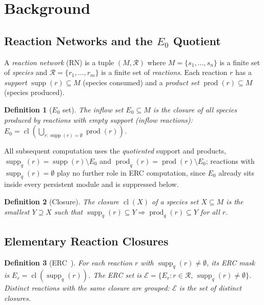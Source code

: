 \documentclass[11pt]{article}
\theoremstyle{plain}
\newtheorem{definition}{Definition}
\theoremstyle{remark}
\newcommand{\supp}{\operatorname{supp}}
\newcommand{\prods}{\operatorname{prod}}
\newcommand{\cl}{\operatorname{cl}}
\newcommand{\E}{\mathcal{E}}
\newcommand{\R}{\mathcal{R}}
\newcommand{\M}{M}
\begin{document}
\section{Background}\label{sec:background}

\subsection{Reaction Networks and the $E_0$ Quotient}

A \emph{reaction network} (RN) is a tuple $(\M, \R)$ where
$\M = \{s_1,\ldots,s_n\}$ is a finite set of \emph{species} and
$\R = \{r_1,\ldots,r_m\}$ is a finite set of \emph{reactions}.
Each reaction $r$ has a \emph{support} $\supp(r) \subseteq \M$
(species consumed) and a \emph{product set} $\prods(r) \subseteq \M$
(species produced).

\begin{definition}[$E_0$ set]
The \emph{inflow set} $E_0 \subseteq \M$ is the closure of all species
produced by reactions with empty support (\emph{inflow reactions}):
$E_0 = \cl(\bigcup_{r:\supp(r)=\emptyset}\prods(r))$.
\end{definition}

All subsequent computation uses the \emph{quotiented} support and
products, $\supp_q(r) = \supp(r) \setminus E_0$ and
$\prods_q(r) = \prods(r) \setminus E_0$; reactions with
$\supp_q(r) = \emptyset$ play no further role in ERC computation, since
$E_0$ already sits inside every persistent module and is suppressed
below.

\begin{definition}[Closure]
The \emph{closure} $\cl(X)$ of a species set $X \subseteq \M$ is the
smallest $Y \supseteq X$ such that
$\supp_q(r) \subseteq Y \Rightarrow \prods_q(r) \subseteq Y$ for all $r$.
\end{definition}

\subsection{Elementary Reaction Closures}

\begin{definition}[ERC~\cite{BMBcompanion}]
For each reaction $r$ with $\supp_q(r) \neq \emptyset$, its
\emph{ERC mask} is $E_r = \cl(\supp_q(r))$.
The ERC set is $\E = \{E_r : r \in \R,\, \supp_q(r) \neq \emptyset\}$.
Distinct reactions with the same closure are grouped: $\E$ is the set of
\emph{distinct} closures.
\end{definition}
\end{document}
